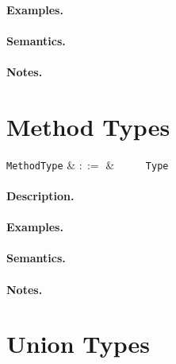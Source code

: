\paragraph{Examples.}

\paragraph{Semantics.}

\paragraph{Notes.}


\section{Method Types}

\begin{syntax}
  \verb+MethodType+ & $::=$ & \ \token{(}\
  \ \token{)}\ \token{=>}\ \verb+Type+\\
\end{syntax}

\paragraph{Description.}  

\paragraph{Examples.}

\paragraph{Semantics.}

\paragraph{Notes.}


\section{Union Types}


